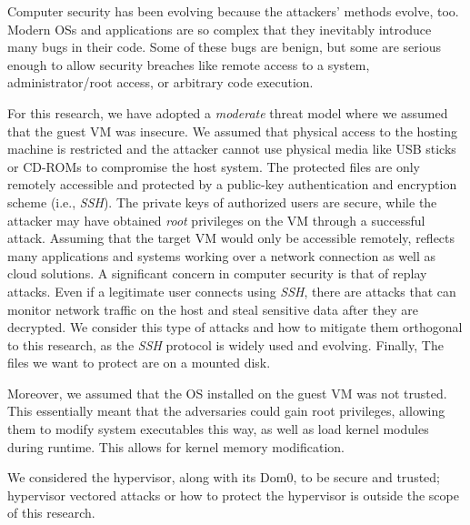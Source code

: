 Computer security has been evolving because the attackers' methods evolve, too. Modern \acp{OS} and applications are so complex that they inevitably introduce many bugs in their code. Some of these bugs are benign, but some are serious enough to allow security breaches like remote access to a system, administrator/root access, or arbitrary code execution.

\par For this research, we have adopted a \emph{moderate} threat model where we assumed that the guest \ac{VM} was insecure. We assumed that physical access to the hosting machine is restricted and the attacker cannot use physical media like USB sticks or CD-ROMs to compromise the host system. The protected files are only remotely accessible and protected  by  a  public-key  authentication  and  encryption scheme (i.e., \emph{SSH}). The  private  keys  of  authorized  users  are  secure, while the attacker may have obtained \emph{root} privileges on the \ac{VM} through a successful attack. Assuming that the target \ac{VM} would only be accessible remotely, reflects many applications and systems working over a network connection as well as cloud solutions. A significant  concern  in  computer security is that of replay attacks. Even if a legitimate user connects using \emph{SSH}, there are attacks that can monitor  network  traffic  on  the  host  and  steal  sensitive data after they are decrypted. We consider this type of attacks and how to mitigate them orthogonal to this research, as the \emph{SSH} protocol is widely used and evolving. Finally, The files we want to protect are on a mounted disk.

\par Moreover, we assumed that the \ac{OS} installed on the guest \ac{VM} was not trusted. This essentially meant that the adversaries could gain root privileges, allowing them to modify system executables this way, as well as load kernel modules during runtime. This allows for kernel memory modification.

\par We considered the hypervisor, along with its Dom0, to be secure and trusted; hypervisor vectored attacks or how to protect the hypervisor is outside the scope of this research.

